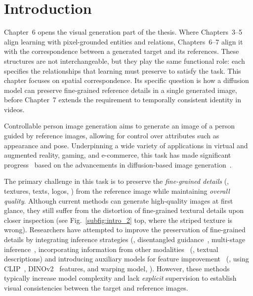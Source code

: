 \section{Introduction}
\label{leffa:sec:introduction}

Chapter~6 opens the visual generation part of the thesis.
Where Chapters~3--5 align learning with pixel-grounded entities and relations, Chapters~6--7 align it with the correspondence between a generated target and its references. These structures are not interchangeable, but they play the same functional role: each specifies the relationships that learning must preserve to satisfy the task.
This chapter focuses on spatial correspondence. Its specific question is how a diffusion model can preserve fine-grained reference details in a single generated image, before Chapter~7 extends the requirement to temporally consistent identity in videos.

Controllable person image generation aims to generate an image of a person guided by reference images, allowing for control over attributes such as appearance and pose.
Underpinning a wide variety of applications in virtual and augmented reality, gaming, and e-commerce, this task has made significant progress~\citep{kim2024stableviton, choi2024improving, chong2024catvton, wan2024improving, bhunia2023person, han2023controllable, lu2024coarse, pham2024cross} based on the advancements in diffusion-based image generation~\citep{ho2020denoising, rombach2022high}.

The primary challenge in this task is to preserve the \textit{fine-grained details} (\eg, textures, texts, logos, \etc) from the reference image while maintaining \textit{overall quality}.
Although current methods can generate high-quality images at first glance, they still suffer from the distortion of fine-grained textural details upon closer inspection (see Fig.~\ref{subfig:intro_2} top, where the striped texture is wrong).
Researchers have attempted to improve the preservation of fine-grained details by integrating inference strategies (\eg, disentangled guidance~\citep{bhunia2023person}, multi-stage inference~\citep{yang2024texture}, incorporating information from other modalities~\citep{ning2024picture, xu2024ootdiffusion, choi2024improving} (\eg, textual descriptions) and introducing auxiliary models for feature improvement~\citep{kim2024stableviton, xu2024ootdiffusion, choi2024improving, wan2024improving, sun2024outfitanyone, lu2024coarse, pham2024cross} (\eg, using CLIP~\citep{radford2021learning}, DINOv2~\citep{oquab2023dinov2} features, and warping model, \etc).
However, these methods typically increase model complexity and lack \textit{explicit} supervision to establish visual consistencies between the target and reference images.

